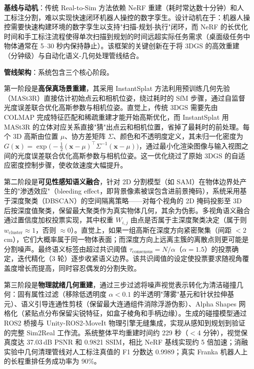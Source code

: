 \textbf{基线与动机}：传统 Real-to-Sim 方法依赖 NeRF 重建（耗时常达数十分钟）和人工标注分割，难以实现快速闭环机器人操控的数字孪生。设计动机在于：机器人操控需要快速构建环境的数字孪生以支持"扫描-规划-执行"闭环，而 NeRF 的长优化时间和手工标注流程使得单次扫描到规划的时间远超实际任务需求（桌面级任务中物体通常在 5--30 秒内保持静止）。该框架的关键创新在于将 3DGS 的高效重建（分钟级）与自动化语义-几何处理管线结合。

\textbf{管线架构}：系统包含三个核心阶段。

第一阶段是\textbf{高保真场景重建}，其采用 InstantSplat 方法利用预训练几何先验（MASt3R）直接估计初始点云和相机位姿，绕过耗时的 SfM 步骤，通过自监督光度误差联合优化高斯参数与相机位姿。直觉上，传统 3DGS 需要先由 COLMAP 完成特征匹配和稀疏重建才能开始高斯优化，而 InstantSplat 用 MASt3R 的立体对应关系直接"猜"出点云和相机位置，省掉了最耗时的前处理。每个 3D 高斯由位置 $\mu$、协方差矩阵 $\Sigma$、颜色和不透明度定义，其未归一化密度为 $G(\mathbf{x}) = \exp\!\bigl(-\frac{1}{2}(\mathbf{x}-\mu)^\top \Sigma^{-1}(\mathbf{x}-\mu)\bigr)$，通过最小化渲染图像与输入视图之间的光度误差联合优化高斯参数与相机位姿。这一优化绕过了原始 3DGS 的自适应密度控制步骤，使收敛速度大幅提升。

第二阶段是\textbf{可见性感知语义融合}，针对 2D 分割模型（如 SAM）在物体边界处产生的"渗透效应"（bleeding effect，即背景像素被误包含进前景掩码），系统采用基于深度聚类（DBSCAN）的空间隔离策略——对每个视角的 2D 掩码投影至 3D 后按深度值聚类，保留最大聚类作为真实物体几何，其余为伪影。多视角语义融合通过置信度加权投票实现，其中权重 $W_{i,j}$ 由点是否属于主深度聚类决定（属于则 $w_\text{cluster} \approx 1$，否则 $\approx 0$）。直觉上，如果一组高斯在深度方向紧密聚集（间距 $< 2\,$cm），它们大概率属于同一物体表面；而深度方向上远离主簇的离散点则更可能是分割噪声。最终语义标签由超过共识阈值 $\tau_\text{consensus} = N/\alpha$（$\alpha=1.5$）的投票确定，迭代精化（3 轮）逐步收紧语义边界。该共识阈值的设定使投票要求随视角覆盖度增长而提高，同时容忍偶发的分割失败。

第三阶段是\textbf{物理就绪几何重建}，通过三步过滤将噪声视觉表示转化为清洁碰撞几何：固有属性过滤（移除低透明度 $\alpha < 0.1$ 的半透明"薄雾"基元和针状拉伸基元）、语义引导连通性剪枝（保留最大连通组件消除浮游伪影）、Alpha Shapes 网格化（紧贴点分布保留尖锐特征，如盒子棱角和手柄边缘）。生成的碰撞模型通过 ROS2 桥接与 Unity-ROS2-MoveIt 物理引擎无缝集成，实现从感知到规划到验证的完整 Sim2Real 工作流。系统整体平均重建时间约 229 秒（$<$4 分钟），视觉保真度达 37.03\,dB PSNR 和 0.9821 SSIM，相比 NeRF 基线实现约 5 倍加速；消融实验中几何清理管线对人工标注真值的 F1 分数达 0.9989；真实 Franka 机器人上的长程重排任务成功率为 90\%。

